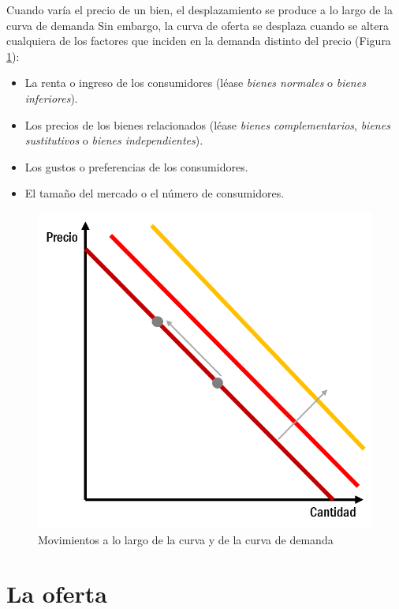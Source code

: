 \documentclass[
]{krantz}
\providecommand{\tightlist}{%
  \setlength{\itemsep}{0pt}\setlength{\parskip}{0pt}}
\begin{document}
Cuando varía el precio de un bien, el desplazamiento se produce a lo largo de la curva de demanda Sin embargo, la curva de oferta se desplaza cuando se altera cualquiera de los factores que inciden en la demanda distinto del precio (Figura \ref{fig:12a-02}):

\begin{itemize}
\tightlist
\item
  La renta o ingreso de los consumidores (léase \emph{bienes normales} o \emph{bienes inferiores}).
\item
  Los precios de los bienes relacionados (léase \emph{bienes complementarios}, \emph{bienes sustitutivos} o \emph{bienes independientes}).
\item
  Los gustos o preferencias de los consumidores.
\item
  El tamaño del mercado o el número de consumidores.
\end{itemize}

\begin{figure}
\centering
\includegraphics{images/12a-02.png}
\caption{\label{fig:12a-02}Movimientos a lo largo de la curva y de la curva de demanda}
\end{figure}

\hypertarget{la-oferta}{%
\section{La oferta}\label{la-oferta}}
\end{document}
